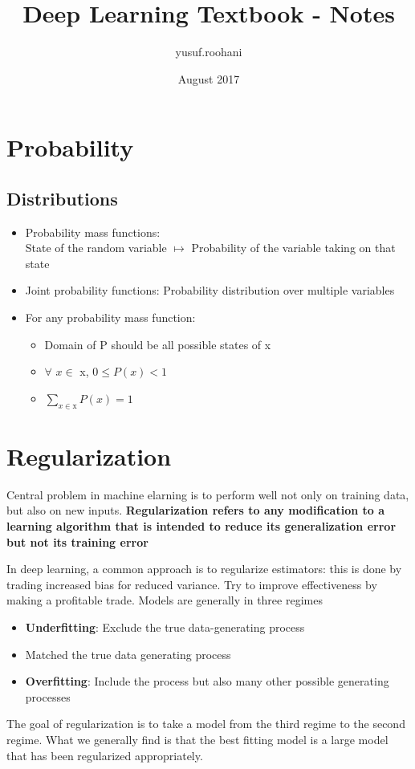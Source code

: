 \documentclass{article}
\title{Deep Learning Textbook - Notes}
\author{yusuf.roohani }
\date{August 2017}
\begin{document}
\maketitle


\section{Probability}

\subsection{Distributions}

\begin{itemize}
    \item Probability mass functions:\\
    State of the random variable $\mapsto$ Probability of the variable taking on that state
    
    \item Joint probability functions:
    Probability distribution over multiple variables
    
    \item 
    For any probability mass function:
    \begin{itemize}
    \item Domain of P should be all possible states of x
    \item $\forall$ $x \in$ x, $ 0 \leq P(x) < 1$
    \item $\sum_{x \in \textrm{x}} P(x) = 1$
    \end{itemize}
\end{itemize}

\section{Regularization}
Central problem in machine elarning is to perform well not only on training data, but also on new inputs. \textbf{Regularization refers to any modification to a learning algorithm that is intended to reduce its generalization error but not its training error}

In deep learning, a common approach is to regularize estimators: this is done by trading increased bias for reduced variance. Try to improve effectiveness by making a profitable trade. Models are generally in three regimes
\begin{itemize}
    \item \textbf{Underfitting}: Exclude the true data-generating process
    \item Matched the true data generating process
    \item \textbf{Overfitting}: Include the process but also many other possible generating processes
\end{itemize}
The goal of regularization is to take a model from the third regime to the second regime. What we generally find is that the best fitting model is a large model that has been regularized appropriately.
\end{document}
